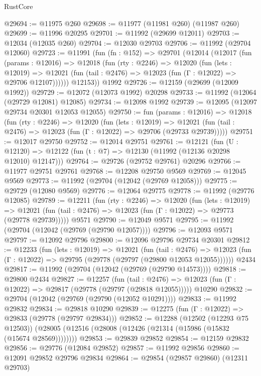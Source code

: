 \begin{lexlean}{RustCore}
\begin{coremodule}
@29694 := @11975 @260
@29698 := @11977 (@11981 @260) (@11987 @260)
@29699 := @11996 @20295
@29701 := @11992 (@29699 @12011)
@29703 := @12034 (@12035 @260)
@29704 := @12030 @29703
@29706 := @11992 (@29704 @12060)
@29723 := @11991
    (fun (fn : @152) =>
    @29701
      (@12014
        (@12017
          (fun (params : @12016) =>
          @12018
            (fun (rty : @2246) =>
            @12020
              (fun (lets : @12019) =>
              @12021 (fun (tail : @2476) => @12023 (fun (Γ : @12022) => @29706 @12107))))))
        @12153))
    @1992
@29726 := @12159 (@29699 (@12009 @1992))
@29729 := @12072 (@12073 @1992) @20298
@29733 := @11992 (@12064 (@29729 @12081) @12085)
@29734 := @12098 @1992
@29739 := @12095 (@12097 @29734 @20301 @12053 @12055)
@29750 := fun (params : @12016) =>
  @12018
    (fun (rty : @2246) =>
    @12020
      (fun (lets : @12019) =>
      @12021 (fun (tail : @2476) => @12023 (fun (Γ : @12022) => @29706 (@29733 @29739)))))
@29751 := @12017 @29750
@29752 := @12014 @29751
@29761 := @12121
    (fun (U : @12120) => @12122 (fun (t : @7) => @12130 (@11992 (@12136 @20298 @12010) @12147)))
@29764 := @29726 (@29752 @29761) @20296
@29766 := @11977 @29751 @29761
@29768 := @12208 @29750 @9569
@29769 := @12045 @9569
@29773 := @11992 (@29704 (@12042 (@29769 @12058)))
@29775 := @29729 (@12080 @9569)
@29776 := @12064 @29775
@29778 := @11992 (@29776 @12085)
@29789 := @12211
    (fun (rty : @2246) =>
    @12020
      (fun (lets : @12019) =>
      @12021 (fun (tail : @2476) => @12023 (fun (Γ : @12022) => @29773 (@29778 @29739)))))
    @9571
@29790 := @12049 @9571
@29795 := @11992 (@29704 (@12042 (@29769 (@29790 @12057))))
@29796 := @12093 @9571
@29797 := @12092 @29796
@29800 := @12096 @29796 @29734 @20301
@29812 := @12233
    (fun (lets : @12019) =>
    @12021
      (fun (tail : @2476) =>
      @12023 (fun (Γ : @12022) => @29795 (@29778 (@29797 (@29800 @12053 @12055))))))
    @2434
@29817 := @11992 (@29704 (@12042 (@29769 (@29790 @14573))))
@29818 := @29800 @2434
@29827 := @12257
    (fun (tail : @2476) => @12023 (fun (Γ : @12022) => @29817 (@29778 (@29797 (@29818 @12055)))))
    @10290
@29832 := @29704 (@12042 (@29769 (@29790 (@12052 @10291))))
@29833 := @11992 @29832
@29834 := @29818 @10290
@29839 := @12275 (fun (Γ : @12022) => @29833 (@29778 (@29797 @29834)))
@29852 := @12288
    (@12502 (@12293 @75 @12503))
    (@28005 (@12516 (@28008 (@12426 (@21314 (@15986 (@15832 (@15674 @28569))))))))
@29853 := @29839 @29852
@29854 := @12159 @29832
@29856 := @29776 (@12084 @29852)
@29857 := @11992 @29856
@29860 := @12091 @29852 @29796 @29834
@29864 := @29854 (@29857 @29860) (@12311 @29703)

\end{coremodule}
\end{lexlean}
